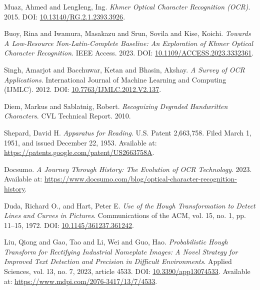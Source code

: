 \label{ch:references}

\begin{thebibliography}{99}

Muaz, Ahmed and LengIeng, Ing. 
\textit{Khmer Optical Character Recognition (OCR)}. 
2015. 
DOI: \href{https://doi.org/10.13140/RG.2.1.2393.3926}{10.13140/RG.2.1.2393.3926}.

Buoy, Rina and Iwamura, Masakazu and Srun, Sovila and Kise, Koichi.
\textit{Towards A Low-Resource Non-Latin-Complete Baseline: An Exploration of Khmer Optical Character Recognition}.
IEEE Access.
2023.
DOI: \href{https://doi.org/10.1109/ACCESS.2023.3332361}{10.1109/ACCESS.2023.3332361}.

Singh, Amarjot and Bacchuwar, Ketan and Bhasin, Akshay.
\textit{A Survey of OCR Applications}.
International Journal of Machine Learning and Computing (IJMLC).
2012.
DOI: \href{https://doi.org/10.7763/IJMLC.2012.V2.137}{10.7763/IJMLC.2012.V2.137}.

Diem, Markus and Sablatnig, Robert.
\textit{Recognizing Degraded Handwritten Characters}.
CVL Technical Report.
2010.

Shepard, David H.
\textit{Apparatus for Reading}.
U.S. Patent 2,663,758. Filed March 1, 1951, and issued December 22, 1953.
Available at: \href{https://patents.google.com/patent/US2663758A}{https://patents.google.com/patent/US2663758A}.

Docsumo.
\textit{A Journey Through History: The Evolution of OCR Technology}.
2023.
Available at: \href{https://www.docsumo.com/blog/optical-character-recognition-history}{https://www.docsumo.com/blog/optical-character-recognition-history}.

Duda, Richard O., and Hart, Peter E.
\textit{Use of the Hough Transformation to Detect Lines and Curves in Pictures}.
Communications of the ACM, vol. 15, no. 1, pp. 11–15, 1972.
DOI: \href{https://doi.org/10.1145/361237.361242}{10.1145/361237.361242}.


Liu, Qiong and Gao, Tao and Li, Wei and Guo, Hao.
\textit{Probabilistic Hough Transform for Rectifying Industrial Nameplate Images: A Novel Strategy for Improved Text Detection and Precision in Difficult Environments}.
Applied Sciences, vol. 13, no. 7, 2023, article 4533.
DOI: \href{https://doi.org/10.3390/app13074533}{10.3390/app13074533}.
Available at: \href{https://www.mdpi.com/2076-3417/13/7/4533}{https://www.mdpi.com/2076-3417/13/7/4533}.


\end{thebibliography}